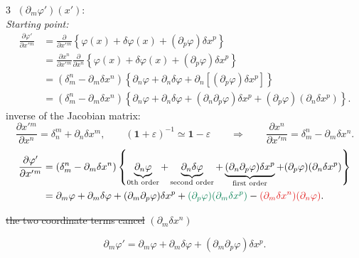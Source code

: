 \documentclass[11pt,a4paper]{article}
\newcommand{\rednote}[1]{\textcolor{noteRed}{#1}}
\newcommand{\greennote}[1]{\textcolor{noteGreen}{#1}}
\begin{document}
\textcircled{3} \;$(\partial_m\varphi')(x')$:\\
\textit{Starting point:}
\[
\begin{aligned}
\frac{\partial\varphi'}{\partial x'{}^m}
&=\frac{\partial}{\partial x'{}^m}
 \left\{\varphi(x)+\delta\varphi(x)+(\partial_p\varphi)\delta x^p\right\}\\
&=\frac{\partial x^n}{\partial x'{}^m}\frac{\partial}{\partial x^n}
 \left\{\varphi(x)+\delta\varphi(x)+(\partial_p\varphi)\delta x^p\right\}\\
&=(\delta_m^n-\partial_m\delta x^n)\left\{
 \partial_n\varphi+\partial_n\delta\varphi
 +\partial_n\left[(\partial_p\varphi)\delta x^p\right]\right\}\\
&=(\delta_m^n-\partial_m\delta x^n)\left\{
 \partial_n\varphi+\partial_n\delta\varphi
 +(\partial_n\partial_p\varphi)\delta x^p
 +(\partial_p\varphi)(\partial_n\delta x^p)\right\}.
\end{aligned}
\]
\rednote{inverse of the Jacobian matrix:}
\[
\frac{\partial x'{}^m}{\partial x^n}=\delta_n^m+\partial_n\delta x^m,
\qquad
(\mathbf{1}+\varepsilon)^{-1}\simeq\mathbf{1}-\varepsilon
\qquad\Longrightarrow\qquad
\frac{\partial x^n}{\partial x'{}^m}=\delta_m^n-\partial_m\delta x^n.
\]
\[
\begin{aligned}
\frac{\partial\varphi'}{\partial x'{}^m}
&=(\delta_m^n-\partial_m\delta x^n)\left\{
\underbrace{\partial_n\varphi}_{0\text{th order}}
+\underbrace{\partial_n\delta\varphi}_{\text{second order}}
+\underbrace{(\partial_n\partial_p\varphi)\delta x^p}_{\text{first order}}
+(\partial_p\varphi)(\partial_n\delta x^p)\right\}\\
&=\partial_m\varphi+\partial_m\delta\varphi
+(\partial_m\partial_p\varphi)\delta x^p
+\greennote{(\partial_p\varphi)(\partial_m\delta x^p)}
-\rednote{(\partial_m\delta x^n)(\partial_n\varphi)}.
\end{aligned}
\]
\begin{flushright}
\greennote{\sout{the two coordinate terms cancel}}\qquad
\rednote{\text{-- }$(\partial_m\delta x^n)$}
\end{flushright}
\[
\boxed{\partial_m\varphi'=\partial_m\varphi+\partial_m\delta\varphi
+(\partial_m\partial_p\varphi)\delta x^p}.
\]
\end{document}
